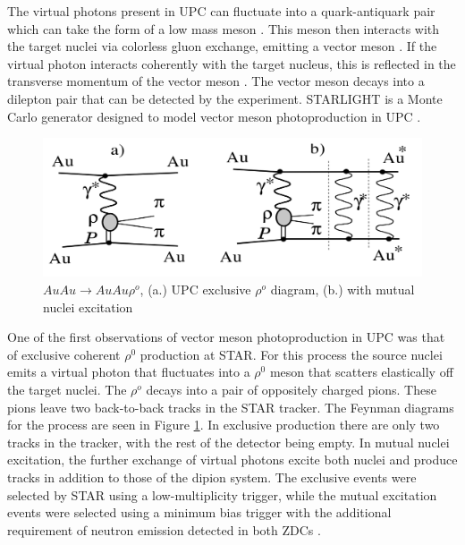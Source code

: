 The virtual photons present in UPC can fluctuate into a quark-antiquark pair which can take the form of a low mass meson \cite{lta2011.09}\cite{Chekanov:2002xi}\cite{Klasen:2007pm}. This meson then interacts with the target nuclei via colorless gluon exchange, emitting a vector meson \cite{Emling:1994gu} \cite{dePassos:2001dc} \cite{Ryskin:1992ui}\cite{Goldhaber:1948zza}. If the virtual photon interacts coherently with the target nucleus, this is reflected in the transverse momentum of the vector meson \cite{Goncalves:2011vf}. The vector meson decays into a dilepton pair that can be detected by the experiment. STARLIGHT is a Monte Carlo generator designed to model vector meson photoproduction in UPC \cite{starlight}.

\begin{figure}[h!]
\begin{centering}
\includegraphics[width=5.5in]{Chapter2/importfigs/upc_star_diagram.png}
\par\end{centering}
\caption{$AuAu \rightarrow AuAu\rho^o$, (a.) UPC exclusive $\rho^o$ diagram, (b.) with mutual nuclei excitation \cite{Adler:2002sc} \label{fig:upcRhoStar}}
\end{figure}

One of the first observations of vector meson photoproduction in UPC was that of exclusive coherent $\rho^0$ production at STAR. For this process the source nuclei emits a virtual photon that fluctuates into a $\rho^0$ meson that scatters elastically off the target nuclei. The $\rho^o$ decays into a pair of oppositely charged pions. These pions leave two back-to-back tracks in the STAR tracker. The Feynman diagrams for the process are seen in Figure \ref{fig:upcRhoStar}. In exclusive production there are only two tracks in the tracker, with the rest of the detector being empty. In mutual nuclei excitation, the further exchange of virtual photons excite both nuclei and produce tracks in addition to those of the dipion system. The exclusive events were selected by STAR using a low-multiplicity trigger, while the mutual excitation events were selected using a minimum bias trigger with the additional requirement of neutron emission detected in both ZDCs \cite{Adler:2002sc}. 

